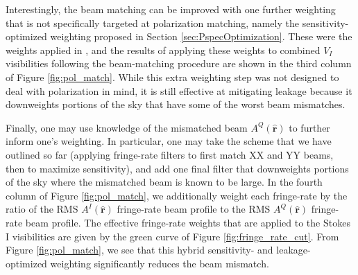 \documentclass[twocolumn,apj,numberedappendix]{emulateapj}
\newcommand{\rhat}{\hat{\mathbf{r}}}
\begin{document}
Interestingly, the beam matching can be improved with one further weighting that 
is not specifically targeted at polarization matching, namely the sensitivity-optimized weighting
proposed in Section \ref{sec:PspecOptimization}. These were the weights applied in \citet{ali_et_al2015},
and the results of applying these weights to combined $V_I$ visibilities following the beam-matching procedure are shown
in the third column of Figure \ref{fig:pol_match}. While this extra weighting step was not designed
to deal with polarization in mind, it is still effective at mitigating leakage because it
downweights portions of the sky that have some of the worst beam mismatches.

Finally, one may use knowledge of the mismatched beam $A^Q (\rhat)$ to further inform one's weighting.
In particular, one may take the scheme that we have outlined so far (applying fringe-rate filters to first match XX and YY beams, then to maximize sensitivity), and add one final filter that downweights
portions of the sky where the mismatched beam is known to be large. In the fourth column of
Figure \ref{fig:pol_match}, we additionally weight each fringe-rate by the ratio of the RMS $A^I (\rhat)$ fringe-rate beam profile to the RMS $A^Q (\rhat)$ fringe-rate beam profile. The effective fringe-rate
weights that are applied to the Stokes I visibilities are given by the green curve of Figure \ref{fig:fringe_rate_cut}. From Figure \ref{fig:pol_match}, we see that this hybrid sensitivity- and leakage-
optimized weighting significantly reduces the beam mismatch.

\end{document}
